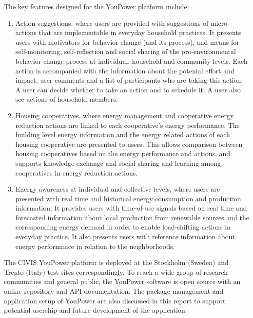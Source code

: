 The key features designed for the YouPower platform include: 

\begin{enumerate}
\item Action suggestions, where users are provided with suggestions of micro-actions that are implementable in everyday household practices. 
% 
It presents users with motivators for behavior change (and its process), and means for self-monitoring, self-reflection and social sharing of the pro-environmental behavior change process at individual, household and community levels. 
Each action is accompanied with the information about the potenial effort and impact, user comments and a list of participants who are taking this action. A user can decide whether to take an action and to schedule it. A user also see actions of household members. 

\item Housing cooperatives, where energy management and cooperative energy reduction actions are linked to each cooperative's energy performance. 
% 
The building level energy information and the energy related actions of each housing cooperative are presented to users. This allows comparison between housing cooperatives based on the energy performance and actions, and supports knowledge exchange and social sharing and learning among cooperatives in energy reduction actions.

\item Energy awareness at individual and collective levels, where users are presented with real time and historical energy consumption and production information. 
% 
It provides users with time-of-use signals based on real time and forecasted information about local production from renewable sources and the corresponding energy demand in order to enable load-shifting actions in everyday practice. It also presents users with reference information about energy performance in relation to the neighborhoods. 

\end{enumerate}

The CIVIS YouPower platform is deployed at the Stockholm (Sweden) and Trento (Italy)
test sites correspondingly. To reach a wide group of research communities and general public, the YouPower software is open source with an online repository and API documentation. The package management and application setup of YouPower are also discussed in this report to support potential usership and future development of the application. 

